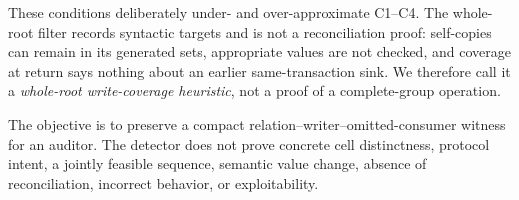 These conditions deliberately under- and over-approximate C1--C4. The whole-root filter records syntactic targets and is not a reconciliation proof: self-copies can remain in its generated sets, appropriate values are not checked, and coverage at return says nothing about an earlier same-transaction sink. We therefore call it a \emph{whole-root write-coverage heuristic}, not a proof of a complete-group operation.

The objective is to preserve a compact relation--writer--omitted-consumer witness for an auditor. The detector does not prove concrete cell distinctness, protocol intent, a jointly feasible sequence, semantic value change, absence of reconciliation, incorrect behavior, or exploitability.
